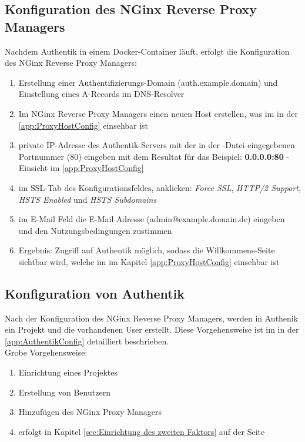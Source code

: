 \subsection{Konfiguration des NGinx Reverse Proxy Managers}
\label{sec:Konfiguration des NGinx Reverse Proxy Managers}
Nachdem Authentik in einem Docker-Container läuft, erfolgt die Konfiguration des NGinx Reverse Proxy Managers:
\begin{enumerate}[label=\arabic*.]
    \item Erstellung einer Authentifizierungs-Domain (auth.example.domain) und Einstellung eines A-Records im \acs{DNS}-Resolver
    \item Im NGinx Reverse Proxy Managers einen neuen Host erstellen, was im  in der \ref{app:ProxyHostConfig}  einsehbar ist
    \item private IP-Adresse des Authentik-Servers mit der in der \textbf{}-Datei eingegebenen Portnummer (80) eingeben 
    mit dem Resultat für das Beispiel: \textbf{0.0.0.0:80} - Einsicht im \ref{app:ProxyHostConfig} 
    \item im SSL-Tab des Konfigurationsfeldes, anklicken: \textit{Force SSL}, \textit{HTTP/2 Support}, \textit{\acs{HSTS} Enabled} und \textit{\acs{HSTS} Subdomains}
    \item im E-Mail Feld die E-Mail Adresse (admin@example.domain.de) eingeben und den Nutzungsbedingungen zustimmen
    \item Ergebnis: Zugriff auf Authentik möglich, sodass die Willkommens-Seite sichtbar wird, welche im  im Kapitel 
    \ref{app:ProxyHostConfig}  einsehbar ist
\end{enumerate}

\subsection{Konfiguration von Authentik}
\label{sec: Konfiguration von Authentik}
Nach der Konfiguration des NGinx Reverse Proxy Managers, werden in Authenik ein Projekt und die vorhandenen User erstellt. Diese Vorgehensweise 
ist im  in der \ref{app:AuthentikConfig}  detailliert beschrieben.
\\Grobe Vorgehensweise:
\begin{enumerate}
    \item Einrichtung eines Projektes
    \item Erstellung von Benutzern
    \item Hinzufügen des NGinx Proxy Managers
    \item {} erfolgt in Kapitel \ref{sec:Einrichtung des zweiten Faktors} auf der 
    Seite \pageref{sec:Einrichtung des zweiten Faktors}
\end{enumerate}


